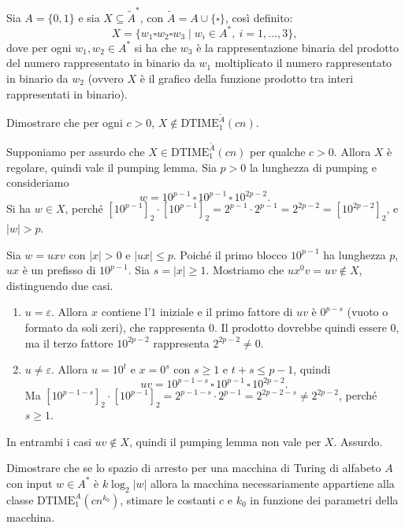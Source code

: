 \begin{ex}
Sia $A=\{0,1\}$ e sia $X\subseteq\widetilde A^{*}$, con $\widetilde A=A\cup\{\square\}$, così definito:
\[
X=\{w_1\square w_2\square w_3\mid w_i\in A^{*},\ i=1,\dots,3\},
\]
dove per ogni $w_1,w_2\in A^{*}$ si ha che $w_3$ è la rappresentazione binaria del prodotto del numero rappresentato in binario da $w_1$ moltiplicato il numero rappresentato in binario da $w_2$ (ovvero $X$ è il grafico della funzione prodotto tra interi rappresentati in binario).

Dimostrare che per ogni $c>0$, $X\notin\mathrm{DTIME}^{\widetilde A}_1(cn)$.
\end{ex}




\begin{sol}
Supponiamo per assurdo che $X\in\mathrm{DTIME}^{\widetilde A}_1(cn)$ per qualche $c>0$. Allora $X$ è regolare, quindi vale il pumping lemma. Sia $p>0$ la lunghezza di pumping e consideriamo
\[
w=10^{p-1}\,\square\,10^{p-1}\,\square\,10^{2p-2}.
\]
Si ha $w\in X$, perché $[10^{p-1}]_2\cdot[10^{p-1}]_2=2^{p-1}\cdot 2^{p-1}=2^{2p-2}=[10^{2p-2}]_2$, e $|w|>p$.

Sia $w=uxv$ con $|x|>0$ e $|ux|\le p$. Poiché il primo blocco $10^{p-1}$ ha lunghezza $p$, $ux$ è un prefisso di $10^{p-1}$. Sia $s=|x|\geq 1$. Mostriamo che $ux^0v=uv\notin X$, distinguendo due casi.
\begin{enumerate}
    \item $u=\varepsilon$. Allora $x$ contiene l'$1$ iniziale e il primo fattore di $uv$ è $0^{p-s}$ (vuoto o formato da soli zeri), che rappresenta $0$. Il prodotto dovrebbe quindi essere $0$, ma il terzo fattore $10^{2p-2}$ rappresenta $2^{2p-2}\neq 0$.
    \item $u\neq\varepsilon$. Allora $u=10^{t}$ e $x=0^{s}$ con $s\ge 1$ e $t+s\le p-1$, quindi
    \[
    uv=10^{p-1-s}\,\square\,10^{p-1}\,\square\,10^{2p-2}.
    \]
    Ma $[10^{p-1-s}]_2\cdot[10^{p-1}]_2=2^{p-1-s}\cdot 2^{p-1}=2^{2p-2-s}\neq 2^{2p-2}$, perché $s\ge1$.
\end{enumerate}
In entrambi i casi $uv\notin X$, quindi il pumping lemma non vale per $X$. Assurdo.
\end{sol}

\newpage

\begin{ex}
Dimostrare che se lo spazio di arresto per una macchina di Turing di alfabeto $A$ con input $w\in A^{*}$ è $k\log_2|w|$ allora la macchina necessariamente appartiene alla classe $\mathrm{DTIME}^{A}_1(cn^{k_0})$, stimare le costanti $c$ e $k_0$ in funzione dei parametri della macchina.
\end{ex}

